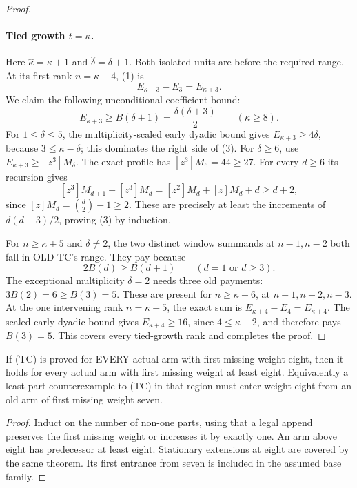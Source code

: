 \begin{proof}
\paragraph{Tied growth $t=\kappa$.}
Here $\widehat\kappa=\kappa+1$ and $\widehat\delta=\delta+1$.
Both isolated units are before the required range. At its first rank
$n=\kappa+4$, (1) is
\[
                  E_{\kappa+3}-E_3=E_{\kappa+3}.        \tag{2}
\]
We claim the following unconditional coefficient bound:
\[
             E_{\kappa+3}\ge B(\delta+1)
                       =\frac{\delta(\delta+3)}2
                              \qquad(\kappa\ge8).       \tag{3}
\]
For $1\le\delta\le5$, the multiplicity-scaled early dyadic bound
gives $E_{\kappa+3}\ge4\delta$, because $3\le\kappa-\delta$;
this dominates the right side of (3). For $\delta\ge6$, use
$E_{\kappa+3}\ge[z^3]M_\delta$. The exact profile has
$[z^3]M_6=44\ge27$. For every $d\ge6$ its recursion gives
\[
 [z^3]M_{d+1}-[z^3]M_d
    =[z^2]M_d+[z]M_d+d\ge d+2,
\]
since $[z]M_d=\binom d2-1\ge2$. These are precisely at least
the increments of $d(d+3)/2$, proving (3) by induction.

For $n\ge\kappa+5$ and $\delta\ne2$, the two distinct window
summands at $n-1,n-2$ both fall in OLD TC's range. They pay because
\[
                  2B(d)\ge B(d+1)\qquad(d=1\text{ or }d\ge3).
                                                               \tag{4}
\]
The exceptional multiplicity $\delta=2$ needs three old payments:
$3B(2)=6\ge B(3)=5$. These are present for $n\ge\kappa+6$,
at $n-1,n-2,n-3$. At the one intervening rank $n=\kappa+5$,
the exact sum is $E_{\kappa+4}-E_4=E_{\kappa+4}$.
The scaled early dyadic bound gives $E_{\kappa+4}\ge16$, since
$4\le\kappa-2$, and therefore pays $B(3)=5$.
This covers every tied-growth rank and completes the proof.
\end{proof}

\begin{corollary}
If (TC) is proved for EVERY actual arm with first missing weight eight,
then it holds for every actual arm with first missing weight at least
eight. Equivalently a least-part counterexample to (TC) in that region
must enter weight eight from an old arm of first missing weight seven.
\end{corollary}
\begin{proof}
Induct on the number of non-one parts, using that a legal append
preserves the first missing weight or increases it by exactly one.
An arm above eight has predecessor at least eight. Stationary
extensions at eight are covered by the same theorem. Its first entrance
from seven is included in the assumed base family.
\end{proof}

